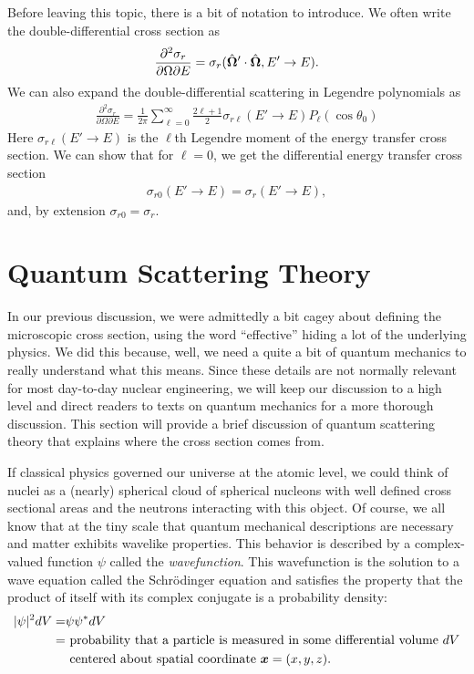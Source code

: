 Before leaving this topic, there is a bit of notation to introduce. We often write the double-differential cross section as
\begin{align}
  \frac{\partial^2 \sigma_r}{\partial \Omega \partial E} = \sigma_r( \hat{\mathbf{\Omega}}' \cdot \hat{\mathbf{\Omega}}, E' \rightarrow E ) .
\end{align}
We can also expand the double-differential scattering in Legendre polynomials as
\begin{align}
  \frac{\partial^2 \sigma_r}{\partial \Omega \partial E} = \frac{1}{2\pi} \sum_{\ell = 0}^\infty \frac{ 2\ell + 1 }{2} \sigma_{r\ell}( E' \rightarrow E ) P_\ell(\cos\theta_0)
\end{align}
Here $\sigma_{r\ell}(E' \rightarrow E)$ is the $\ell$th Legendre moment of the energy transfer cross section. We can show that for $\ell = 0$, we get the differential energy transfer cross section
\begin{align}
  \sigma_{r0}(E' \rightarrow E) = \sigma_{r}(E' \rightarrow E),
\end{align}
and, by extension $\sigma_{r0} = \sigma_r$.

\section{Quantum Scattering Theory}

In our previous discussion, we were admittedly a bit cagey about defining the microscopic cross section, using the word ``effective'' hiding a lot of the underlying physics. We did this because, well, we need a quite a bit of quantum mechanics to really understand what this means. Since these details are not normally relevant for most day-to-day nuclear engineering, we will keep our discussion to a high level and direct readers to texts on quantum mechanics for a more thorough discussion. This section will provide a brief discussion of quantum scattering theory that explains where the cross section comes from. 

If classical physics governed our universe at the atomic level, we could think of nuclei as a (nearly) spherical cloud of spherical nucleons with well defined cross sectional areas and the neutrons interacting with this object. Of course, we all know that at the tiny scale that quantum mechanical descriptions are necessary and matter exhibits wavelike properties. This behavior is described by a complex-valued function $\psi$ called the \emph{wavefunction}. This wavefunction is the solution to a wave equation called the Schr\"{o}dinger equation and satisfies the property that the product of itself with its complex conjugate is a probability density:
\begin{align}
  | \psi |^2 dV = &\psi \psi^* dV \nonumber \\
  = &\text{ probability that a particle is measured in some differential volume $dV$} \nonumber \\
    &\text{ centered about spatial coordinate $\bm{x} = (x,y,z)$.} \nonumber
\end{align}


